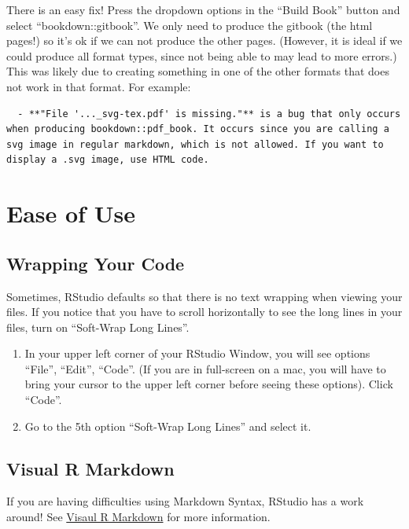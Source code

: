 \documentclass[
]{book}
\theoremstyle{definition}
\theoremstyle{definition}
\theoremstyle{definition}
\theoremstyle{definition}
\theoremstyle{remark}
\begin{document}
\begin{itemize}
  There is an easy fix! Press the dropdown options in the ``Build Book'' button and select ``bookdown::gitbook''. We only need to produce the gitbook (the html pages!) so it's ok if we can not produce the other pages. (However, it is ideal if we could produce all format types, since not being able to may lead to more errors.) This was likely due to creating something in one of the other formats that does not work in that format. For example:

\begin{verbatim}
  - **"File '..._svg-tex.pdf' is missing."** is a bug that only occurs when producing bookdown::pdf_book. It occurs since you are calling a svg image in regular markdown, which is not allowed. If you want to display a .svg image, use HTML code. 
\end{verbatim}
\end{itemize}

\section{Ease of Use}\label{ease-of-use}

\subsection{Wrapping Your Code}\label{wrapping-your-code}

Sometimes, RStudio defaults so that there is no text wrapping when viewing your files. If you notice that you have to scroll horizontally to see the long lines in your files, turn on ``Soft-Wrap Long Lines''.

\begin{enumerate}
\def\labelenumi{\arabic{enumi}.}
\item
  In your upper left corner of your RStudio Window, you will see options ``File'', ``Edit'', ``Code''. (If you are in full-screen on a mac, you will have to bring your cursor to the upper left corner before seeing these options). Click ``Code''.
\item
  Go to the 5th option ``Soft-Wrap Long Lines'' and select it.
\end{enumerate}

\subsection{Visual R Markdown}\label{visual-r-markdown}

If you are having difficulties using Markdown Syntax, RStudio has a work around! See \hyperref[visual-r-md]{Visaul R Markdown} for more information.
\end{document}
